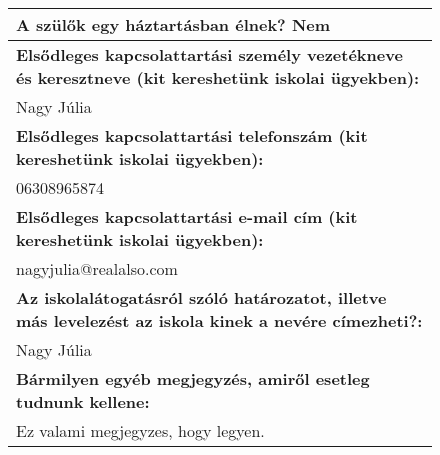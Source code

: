 \documentclass[10pt,a4paper]{article}
\begin{document}
\begin{figure}[!ht]
\begin{tabular}{|m{\textwidth}|}
\hline\vspace{3pt}
\textbf{A szülők egy háztartásban élnek? } \hspace{0.5cm} Nem \vspace{3pt} \\
\hline\vspace{3pt}
\textbf{Elsődleges kapcsolattartási személy vezetékneve és keresztneve (kit kereshetünk iskolai ügyekben):} \\ \hspace{0.5cm} Nagy Júlia \vspace{3pt} \\
\hline\vspace{3pt}
\textbf{Elsődleges kapcsolattartási telefonszám (kit kereshetünk iskolai ügyekben):} \\ \hspace{0.5cm} 06308965874 \vspace{3pt} \\
\hline\vspace{3pt}
\textbf{Elsődleges kapcsolattartási e-mail cím (kit kereshetünk iskolai ügyekben):} \\ \hspace{0.5cm} nagyjulia@realalso.com \vspace{3pt} \\
\hline\vspace{3pt}
\textbf{Az iskolalátogatásról szóló határozatot, illetve más levelezést az iskola kinek a nevére címezheti?:} \\ \hspace{0.5cm} Nagy Júlia \vspace{3pt} \\
\hline\vspace{3pt}
\textbf{Bármilyen egyéb megjegyzés, amiről esetleg tudnunk kellene:} \\ \hspace{0.5cm} Ez valami megjegyzes, hogy legyen. \vspace{3pt} \\


\end{tabular}
\end{figure}
\end{document}
